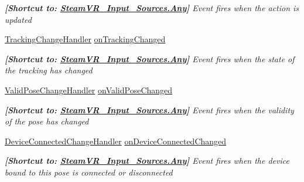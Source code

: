 \begin{DoxyCompactItemize}
\begin{DoxyCompactList}\small\item\em {\bfseries{\mbox{[}Shortcut to\+: \mbox{\hyperlink{namespace_valve_1_1_v_r_a82e5bf501cc3aa155444ee3f0662853faed36a1ef76a59ee3f15180e0441188ad}{Steam\+V\+R\+\_\+\+Input\+\_\+\+Sources.\+Any}}\mbox{]}}} Event fires when the action is updated \end{DoxyCompactList}\item 
\mbox{\hyperlink{class_valve_1_1_v_r_1_1_steam_v_r___action___pose_a52e352705659c14685cf8a88ef4bafd6}{Tracking\+Change\+Handler}} \mbox{\hyperlink{class_valve_1_1_v_r_1_1_steam_v_r___action___pose_a995b370f9b9a08c25a934eb2beb2c5cd}{on\+Tracking\+Changed}}
\begin{DoxyCompactList}\small\item\em {\bfseries{\mbox{[}Shortcut to\+: \mbox{\hyperlink{namespace_valve_1_1_v_r_a82e5bf501cc3aa155444ee3f0662853faed36a1ef76a59ee3f15180e0441188ad}{Steam\+V\+R\+\_\+\+Input\+\_\+\+Sources.\+Any}}\mbox{]}}} Event fires when the state of the tracking has changed \end{DoxyCompactList}\item 
\mbox{\hyperlink{class_valve_1_1_v_r_1_1_steam_v_r___action___pose_a742270a6bddfea2afd7f535378ae7830}{Valid\+Pose\+Change\+Handler}} \mbox{\hyperlink{class_valve_1_1_v_r_1_1_steam_v_r___action___pose_a058e7ac6982769f7b51e41a4e61ad7de}{on\+Valid\+Pose\+Changed}}
\begin{DoxyCompactList}\small\item\em {\bfseries{\mbox{[}Shortcut to\+: \mbox{\hyperlink{namespace_valve_1_1_v_r_a82e5bf501cc3aa155444ee3f0662853faed36a1ef76a59ee3f15180e0441188ad}{Steam\+V\+R\+\_\+\+Input\+\_\+\+Sources.\+Any}}\mbox{]}}} Event fires when the validity of the pose has changed \end{DoxyCompactList}\item 
\mbox{\hyperlink{class_valve_1_1_v_r_1_1_steam_v_r___action___pose_a40c6d9862680e8c99781b3a109d94b82}{Device\+Connected\+Change\+Handler}} \mbox{\hyperlink{class_valve_1_1_v_r_1_1_steam_v_r___action___pose_a8d9a19a844746eff2dac4a0c75382ecc}{on\+Device\+Connected\+Changed}}
\begin{DoxyCompactList}\small\item\em {\bfseries{\mbox{[}Shortcut to\+: \mbox{\hyperlink{namespace_valve_1_1_v_r_a82e5bf501cc3aa155444ee3f0662853faed36a1ef76a59ee3f15180e0441188ad}{Steam\+V\+R\+\_\+\+Input\+\_\+\+Sources.\+Any}}\mbox{]}}} Event fires when the device bound to this pose is connected or disconnected \end{DoxyCompactList}\end{DoxyCompactItemize}
